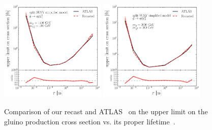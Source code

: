 \begin{figure}[t]
\begin{center}
\includegraphics[width=0.45\textwidth]{ch5-figures/limits_gluino1_FIXED.pdf}
\includegraphics[width=0.45\textwidth]{ch5-figures/limits_gluino2_FIXED.pdf}
\caption{ Comparison of our recast and ATLAS~\cite{Aaboud:2017iio} on the upper limit on the gluino production cross section vs. its proper lifetime~\cite{LesHouches2017}.}
\label{fig:DVsigmaLimits}
\end{center}
\end{figure}


